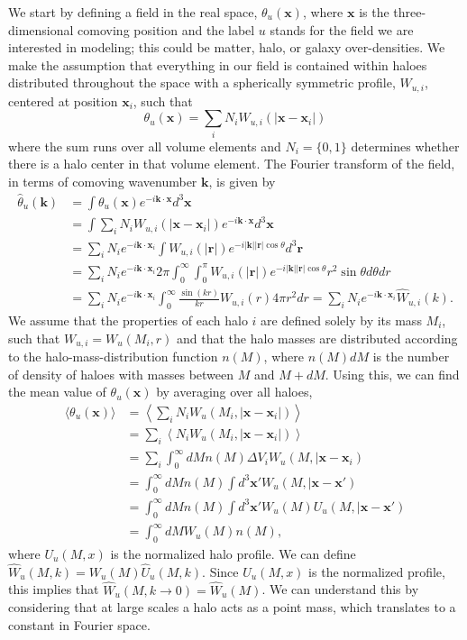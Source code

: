 We start by defining a field in the real space, $\theta_u(\bm{x})$, where $\bm{x}$ is the three-dimensional comoving position and the label $u$ stands for the field we are interested in modeling; this could be matter, halo, or galaxy over-densities. We make the assumption that everything in our field is contained within haloes distributed throughout the space with a spherically symmetric profile, $W_{u, i}$, centered at position $\bm{x}_i$, such that
\begin{equation}
    \theta_u(\bm{x}) = \sum_i N_i W_{u, i}\left(|\bm{x} - \bm{x}_i|\right)
    \label{eq:1}
\end{equation}
where the sum runs over all volume elements and $N_i = \{0, 1\}$ determines whether there is a halo center in that volume element. The Fourier transform of the field, in terms of comoving wavenumber $\bm{k}$, is given by
\begin{align}
    \label{eq:2}
    \hat{\theta}_u(\bm{k}) &= \int \theta_u(\bm{x}) e^{-i\bm{k}\cdot\bm{x}} d^3\bm{x} \\
    &= \int  \sum_i N_i W_{u, i}\left(|\bm{x} - \bm{x}_i|\right) e^{-i\bm{k}\cdot\bm{x}} d^3\bm{x} \\
    &= \sum_i N_i e^{- i\bm{k} \cdot \bm{x}_i} \int W_{u, i}(|\bm{r}|) e^{-i |\bm{k}| |\bm{r}| \cos\theta} d^3\bm{r} \\
    &= \sum_i N_i e^{- i\bm{k} \cdot \bm{x}_i} 2\pi \int_0^\infty \int_0^\pi W_{u, i}(|\bm{r}|) e^{-i |\bm{k}| |\bm{r}| \cos\theta} r^2 \sin\theta d\theta dr \\
    &= \sum_i N_i e^{- i\bm{k} \cdot \bm{x}_i} \int_0^\infty \frac{\sin(kr)}{kr} W_{u, i}(r) 4\pi r^2 dr = \sum_i N_i e^{-i \bm{k} \cdot \bm{x}_i} \hat{W}_{u, i}(k).
    \label{eq:field}
\end{align}
We assume that the properties of each halo $i$ are defined solely by its mass $M_i$, such that $W_{u, i} = W_u(M_i, r)$ and that the halo masses are distributed according to the halo-mass-distribution function $n(M)$, where $n(M) dM$ is the number of density of haloes with masses between $M$ and $M+dM$. Using this, we can find the mean value of $\theta_u(\bm{x})$ by averaging over all haloes,
\begin{align}
    \langle\theta_u(\bm{x})\rangle &= \left\langle\sum_iN_iW_u(M_i, |\bm{x} - \bm{x}_i|)\right\rangle\\
    &= \sum_i\left\langle N_iW_u(M_i, |\bm{x} - \bm{x}_i|)\right\rangle\\
    &= \sum_i \int_0^\infty dM n(M) \Delta V_i  W_u(M, |\bm{x} - \bm{x}_i) \\
    &= \int_0^\infty dM n(M) \int d^3 \bm{x}' W_u(M, |\bm{x} - \bm{x}') \\
    &= \int_0^\infty dM n(M) \int d^3 \bm{x}' W_u(M) U_u(M, |\bm{x} - \bm{x}') \\
    &= \int_0^\infty dM W_u(M) n(M),
\end{align}
where $U_u(M, x)$ is the normalized halo profile. We can define $\hat{W}_u(M, k) = W_u(M)\hat{U}_u(M, k)$. Since $U_u(M, x)$ is the normalized profile, this implies that $\hat{W}_u(M, k\to0) = \hat{W}_u(M)$. We can understand this by considering that at large scales a halo acts as a point mass, which translates to a constant in Fourier space.

